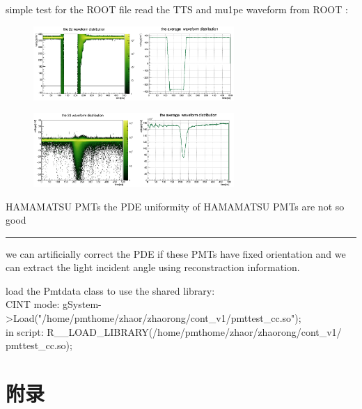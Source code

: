 \documentclass[11pt,compress,xcolor=x11names,UTF8]{beamer}
\begin{document}
\begin{frame}{simple test for the ROOT file}
read the TTS and mu1pe waveform from ROOT :
\begin{figure}
\centering
\includegraphics[width=0.68\textwidth]{ttswave} %
\end{figure}
\begin{figure}
\centering
\includegraphics[width=0.68\textwidth]{mu1pe} %
\end{figure}
\end{frame}

\begin{frame}{HAMAMATSU PMTs}
the PDE uniformity of HAMAMATSU PMTs are not so good
\hrule{\textwidth}
we can artificially correct the PDE if these PMTs have fixed orientation and we can extract the light incident angle using reconstraction information.
\end{frame}


\begin{frame}

\end{frame}
\begin{frame}{load the Pmtdata class}
	to use the shared library:\\
CINT mode: gSystem->Load("/home/pmthome/zhaor/zhaorong/cont\_v1/pmttest\_cc.so");\\
in script: R\_\_LOAD\_LIBRARY(/home/pmthome/zhaor/zhaorong/cont\_v1/\\
	pmttest\_cc.so);
\end{frame}


%
%

\appendix

\section*{附录}
\end{document}
